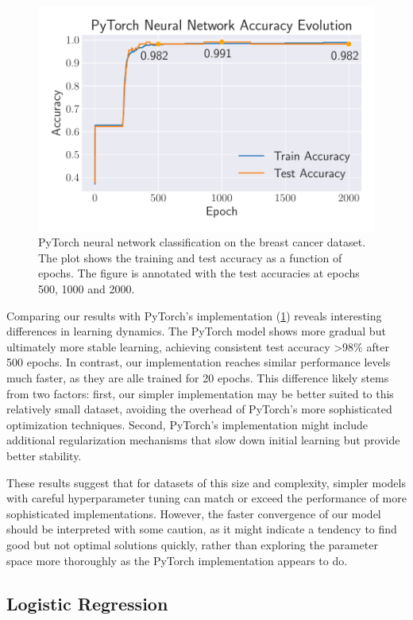 \begin{figure}[h!]
    \centering
    \includegraphics[width =.45\textwidth]{../figs/nn_torch_breast_cancer.pdf}
    \caption{PyTorch neural network classification on the breast cancer dataset. The plot shows the training and test accuracy as a function of epochs. The figure is annotated with the test accuracies at epochs 500, 1000 and 2000.}
    \label{fig:NN_Torch_breast_cancer}
\end{figure}

Comparing our results with PyTorch's implementation (\cref{fig:NN_Torch_breast_cancer}) reveals interesting differences in learning dynamics. The PyTorch model shows more gradual but ultimately more stable learning, achieving consistent test accuracy >98\% after 500 epochs. In contrast, our implementation reaches similar performance levels much faster, as they are alle trained for 20 epochs. This difference likely stems from two factors: first, our simpler implementation may be better suited to this relatively small dataset, avoiding the overhead of PyTorch's more sophisticated optimization techniques. Second, PyTorch's implementation might include additional regularization mechanisms that slow down initial learning but provide better stability.

These results suggest that for datasets of this size and complexity, simpler models with careful hyperparameter tuning can match or exceed the performance of more sophisticated implementations. However, the faster convergence of our model should be interpreted with some caution, as it might indicate a tendency to find good but not optimal solutions quickly, rather than exploring the parameter space more thoroughly as the PyTorch implementation appears to do.

\clearpage
\onecolumngrid
\subsection{Logistic Regression}

